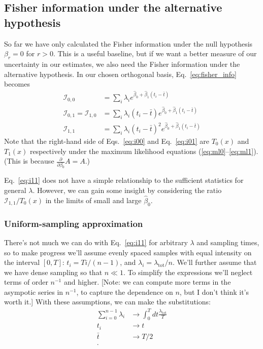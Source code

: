 \documentclass[12pt, letterpaper]{article}
\newcommand{ \lambtot }{\lambda_{\text{tot}}}
\begin{document}
\subsection{Fisher information under the alternative hypothesis}

So far we have only calculated the Fisher information under the null hypothesis $\beta_r = 0$ for $r > 0$.
This is a useful baseline, but if we want a better measure of our uncertainty in our estimates, we also need the Fisher information under the alternative hypothesis.
In our chosen orthogonal basis, Eq.~\ref{eq:fisher_info} becomes
\begin{align}
    \mathcal{I}_{0,0} &= \sum_i \lambda_i e^{\hat{\beta}_0 + \hat{\beta}_1 (t_i - \bar{t})} \label{eq:i00} \\
    \mathcal{I}_{0,1} = \mathcal{I}_{1,0} &= \sum_i \lambda_i (t_i - \bar{t}) e^{\hat{\beta}_0 + \hat{\beta}_1 (t_i - \bar{t})} \label{eq:i01} \\
    \mathcal{I}_{1,1} &= \sum_i \lambda_i {(t_i - \bar{t})}^2 e^{\hat{\beta}_0 + \hat{\beta}_1 (t_i - \bar{t})} \label{eq:i11}
\end{align}
Note that the right-hand side of Eqs.~\ref{eq:i00} and Eq.~\ref{eq:i01} are $T_0(x)$ and $T_1(x)$ respectively under the maximum likelihood equations (\ref{eq:ml0}--\ref{eq:ml1}). (This is because $\frac{\partial}{\partial \beta_0}A = A$.)

Eq.~\ref{eq:i11} does not have a simple relationship to the sufficient statistics for general $\lambda$.
However, we can gain some insight by considering the ratio $\mathcal{I}_{1,1} / T_0(x)$ in the limits of small and large $\hat{\beta}_0$.

\subsubsection{Uniform-sampling approximation}

There's not much we can do with Eq.~\ref{eq:i11} for arbitrary $\lambda$ and sampling times, so to make progress we'll assume evenly spaced samples with equal intensity on the interval $[0, T]$: $t_i = T i / (n - 1)$, and $\lambda_i = \lambtot / n$.
We'll further assume that we have dense sampling so that $n \ll 1$.
To simplify the expressions we'll neglect terms of order $n^{-1}$ and higher.
[Note: we can compute more terms in the asympotic series in $n^{-1}$, to capture the dependence on $n$, but I don't think it's worth it.]
With these assumptions, we can make the substitutions:
\begin{align}
    \sum_{i=0}^{n-1} \lambda_i & \to \int_0^T dt \frac{\lambtot}{T} \\
    t_i & \to t \\
    \bar{t} & \to T / 2 \\.
\end{align}
\end{document}
